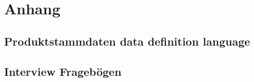 \UseRawInputEncoding

\chapter{Anhang}\label{app:Anhang}

\section{Produktstammdaten data definition language}\label{app:ddl}


\section{Interview Fragebögen}\label{app:fragen}

